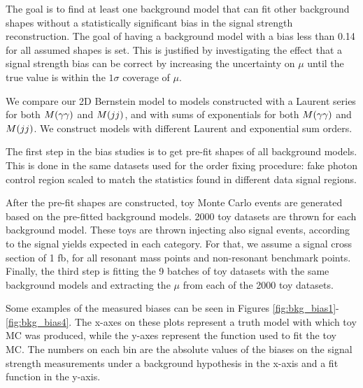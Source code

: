 The goal is to find at least one background model that can fit other background shapes without a statistically significant bias in the signal strength reconstruction. The goal of having a background model with a bias less than 0.14 for all assumed shapes is set. This is justified by investigating the effect that a signal strength bias can be correct by increasing the uncertainty on $\mu$ until the true value is within the $1\sigma$ coverage of $\mu$. 

We compare our 2D Bernstein model to models constructed with a Laurent series for both $M(\gamma\gamma)$ and $M(jj)$, and with sums of exponentials for both $M(\gamma\gamma)$ and $M(jj)$. 
We construct models with different Laurent and exponential sum orders. 

The first step in the bias studies is to get pre-fit shapes of all background models. 
This is done in the same datasets used for the order fixing procedure: fake photon control region scaled to match the statistics found in different data signal regions. 

After the pre-fit shapes are constructed, toy Monte Carlo events are generated based on the pre-fitted background models. 2000 toy datasets are thrown for each background model. These toys are thrown injecting also signal events, according to the signal yields expected in each category. For that, we assume a signal cross section of 1 fb, for all resonant mass points and non-resonant benchmark points. Finally, the third step is fitting the 9 batches of toy datasets with the same background models and extracting the $\mu$ from each of the 2000 toy datasets. %

Some examples of the measured biases can be seen in Figures \ref{fig:bkg_bias1}-\ref{fig:bkg_bias4}. 
The x-axes on these plots represent a truth model with which toy MC was produced, while the y-axes represent the function used to fit the toy MC. 
The numbers on each bin are the absolute values of the biases on the signal strength measurements under a background hypothesis in the x-axis and a fit function in the y-axis. 

